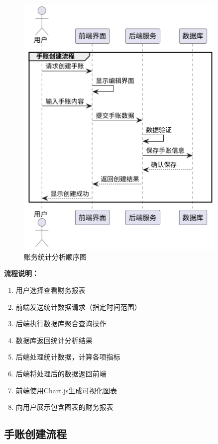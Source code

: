 \documentclass[a4paper]{article}
\begin{document}
\begin{figure}[H]
\centering
\includegraphics[width=0.9\textwidth]{img/sequence_diagram4.png}
\caption{账务统计分析顺序图}
\end{figure}

\textbf{流程说明：}

\begin{enumerate}
    \item 用户选择查看财务报表
    \item 前端发送统计数据请求（指定时间范围）
    \item 后端执行数据库聚合查询操作
    \item 数据库返回统计分析结果
    \item 后端处理统计数据，计算各项指标
    \item 后端将处理后的数据返回前端
    \item 前端使用Chart.js生成可视化图表
    \item 向用户展示包含图表的财务报表
\end{enumerate}

\subsection{手账创建流程}
\end{document}
